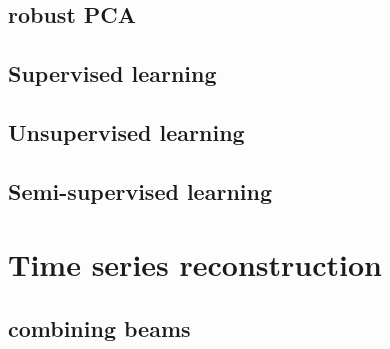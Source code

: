 \documentclass[journal]{IEEEtran}
\renewcommand{\Vec}[1]{\mathbf{#1}}
\newcommand{\Mat}[1]{\mathbf{#1}}
\begin{document}




\subsection{robust PCA}



\subsection{Supervised learning}
\subsection{Unsupervised learning}
\subsection{Semi-supervised learning}
\section{Time series reconstruction}
\subsection{combining beams}

\end{document}
